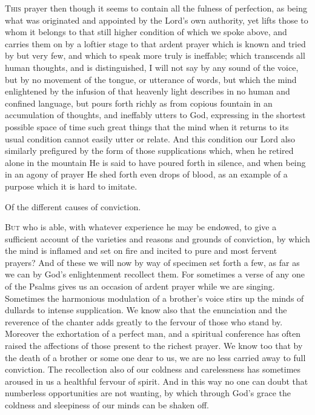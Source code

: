 \textsc{This} prayer then though it seems to contain all the fulness of perfection, as being what was originated and appointed by the Lord’s own authority, yet lifts those to whom it belongs to that still higher condition of which we spoke above, and carries them on by a loftier stage to that ardent prayer which is known and tried by but very few, and which to speak more truly is ineffable; which transcends all human thoughts, and is distinguished, I will not say by any sound of the voice, but by no movement of the tongue, or utterance of words, but which the mind enlightened by the infusion of that heavenly light describes in no human and confined language, but pours forth richly as from copious fountain in an accumulation of thoughts, and ineffably utters to God, expressing in the shortest possible space of time such great things that the mind when it returns to its usual condition cannot easily utter or relate. And this condition our Lord also similarly prefigured by the form of those supplications which, when he retired alone in the mountain He is said to have poured forth in silence, and when being in an agony of prayer He shed forth even drops of blood, as an example of a purpose which it is hard to imitate.


Of the different causes of conviction.

\textsc{But} who is able, with whatever experience he may be endowed, to give a sufficient account of the varieties and reasons and grounds of conviction, by which the mind is inflamed and set on fire and incited to pure and most fervent prayers? And of these we will now by way of specimen set forth a few, as far as we can by God’s enlightenment recollect them. For sometimes a verse of any one of the Psalms gives us an occasion of ardent prayer while we are singing. Sometimes the harmonious modulation of a brother’s voice stirs up the minds of dullards to intense supplication. We know also that the enunciation and the reverence of the chanter adds greatly to the fervour of those who stand by. Moreover the exhortation of a perfect man, and a spiritual conference has often raised the affections of those present to the richest prayer. We know too that by the death of a brother or some one dear to us, we are no less carried away to full conviction. The recollection also of our coldness and carelessness has sometimes aroused in us a healthful fervour of spirit. And in this way no one can doubt that numberless opportunities are not wanting, by which through God’s grace the coldness and sleepiness of our minds can be shaken off.

